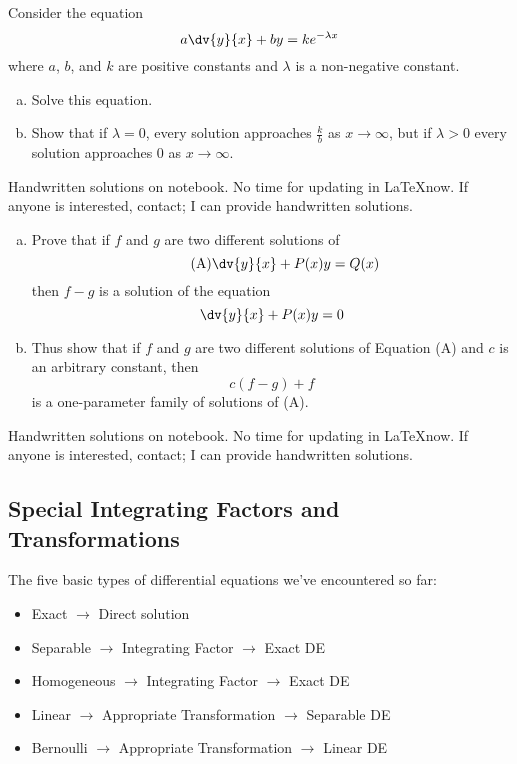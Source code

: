 \begin{exercise}{
    Consider the equation \[
        a\dv{y}{x} + by = ke^{-\lambda x} 
    \] where $a$, $b$, and $k$ are positive constants and $\lambda$ is a non-negative constant.
    \begin{enumerate}[(a)]
        \item Solve this equation.
        \item Show that if $\lambda=0$, every solution approaches $\frac{k}{b}$ as $x \to \infty$, but if $\lambda>0$ every solution approaches $0$ as $x \to \infty$.
    \end{enumerate}
    }{}
    Handwritten solutions on notebook. No time for updating in \LaTeX now. If anyone is interested, contact; I can provide handwritten solutions.
\end{exercise}

\begin{exercise}{
    \begin{enumerate}[(a)]
        \item Prove that if $f$ and $g$ are two different solutions of
        \begin{equation}\tag{A}
            \dv{y}{x} + P(x)y = Q(x)
        \end{equation}
    then $f-g$ is a solution of the equation \[
        \dv{y}{x} + P(x)y = 0
    \]
    \item Thus show that if $f$ and $g$ are two different solutions of Equation (A) and $c$ is an arbitrary constant, then \[
        c(f-g) + f
    \] is a one-parameter family of solutions of (A).
    \end{enumerate}
    }{}
    Handwritten solutions on notebook. No time for updating in \LaTeX now. If anyone is interested, contact; I can provide handwritten solutions.
\end{exercise}



\subsection{Special Integrating Factors and Transformations}
The five basic types of differential equations we've encountered so far:\\
\begin{itemize}
    \item Exact $ \to $ Direct solution
    \item Separable $ \to $ Integrating Factor $ \to $ Exact DE
    \item Homogeneous $ \to $ Integrating Factor $ \to $ Exact DE
    \item Linear $ \to $ Appropriate Transformation $ \to $ Separable DE
    \item Bernoulli $ \to $ Appropriate Transformation $ \to $ Linear DE
\end{itemize}

